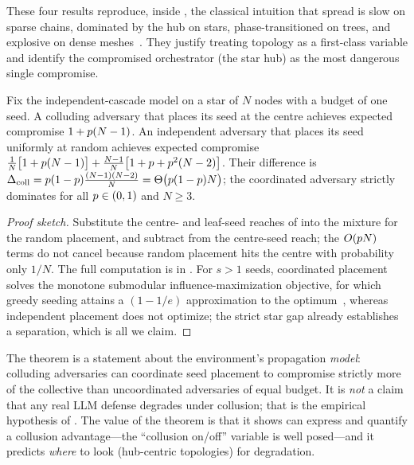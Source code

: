 These four results reproduce, inside , the classical intuition that spread is
slow on sparse chains, dominated by the hub on stars, phase-transitioned on trees, and
explosive on dense meshes~\cite{granovetter1978threshold,watts2002simple,kempe2003maximizing,chalupa1979bootstrap}.
They justify treating topology as a first-class variable and identify the compromised
orchestrator (the star hub) as the most dangerous single compromise.

\begin{theorem}
\label{thm:collusion}
Fix the independent-cascade model on a star of $N$ nodes with a budget of one seed. A
colluding adversary that places its seed at the centre achieves expected compromise
$1+p(N-1)$. An independent adversary that places its seed uniformly at random achieves
expected compromise $\tfrac{1}{N}\bigl[1+p(N-1)\bigr]+\tfrac{N-1}{N}\bigl[1+p+p^{2}(N-2)\bigr]$.
Their difference is $\Delta_{\mathrm{coll}}=p(1-p)\tfrac{(N-1)(N-2)}{N}=\Theta\bigl(p(1-p)N\bigr)$;
the coordinated adversary strictly dominates for all $p\in(0,1)$ and $N\ge3$.
\end{theorem}
\begin{proof}[Proof sketch]
Substitute the centre- and leaf-seed reaches of  into the mixture for the
random placement, and subtract from the centre-seed reach; the $O(p N)$ terms do not
cancel because random placement hits the centre with probability only $1/N$. The full
computation is in . For $s>1$ seeds, coordinated placement solves the
monotone submodular influence-maximization objective, for which greedy seeding attains a
$(1-1/e)$ approximation to the optimum~\cite{kempe2003maximizing}, whereas independent
placement does not optimize; the strict star gap already establishes a separation, which is
all we claim.
\end{proof}

\begin{remark}
\label{rem:collusion}
The theorem is a statement about the environment's propagation \emph{model}: colluding
adversaries can coordinate seed placement to compromise strictly more of the collective
than uncoordinated adversaries of equal budget. It is \emph{not} a claim that any real LLM
defense degrades under collusion; that is the empirical hypothesis of
. The value of the theorem is that it shows  can express
and quantify a collusion advantage---the ``collusion on/off'' variable is well posed---and
it predicts \emph{where} to look (hub-centric topologies) for degradation.
\end{remark}

